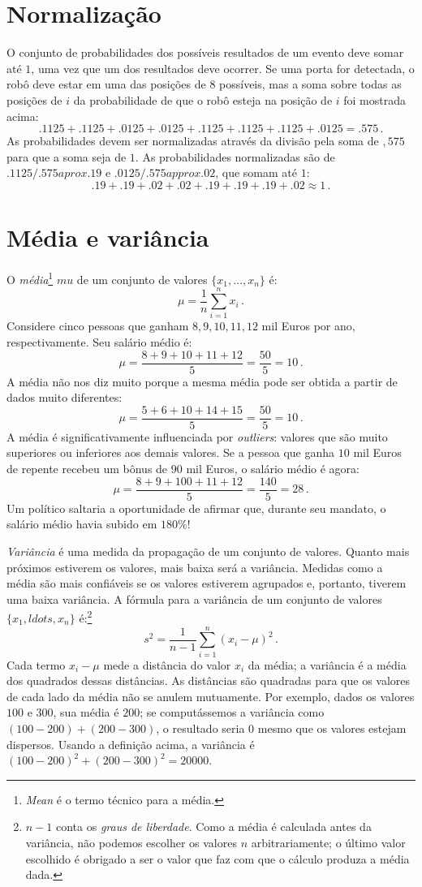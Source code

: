 \section{Normalização}\label{a.normalize}

O conjunto de probabilidades dos possíveis resultados de um evento deve somar até $1$, uma vez que um dos resultados deve ocorrer. Se uma porta for detectada, o robô deve estar em uma das posições de $8$ possíveis, mas a soma sobre todas as posições de $i$ da probabilidade de que o robô esteja na posição de $i$ foi mostrada acima:
\[
.1125 + .1125 + .0125 + .0125 + .1125 + .1125 + .1125 + .0125 = .575\,.
\]
As probabilidades devem ser {normalizadas} através da divisão pela soma de $,575$ para que a soma seja de $1$. As probabilidades normalizadas são de $.1125/.575 aprox .19$ e $.0125/.575 approx .02$, que somam até $1$:
\[.19 + .19 + .02 + .02 + .19 + .19 + .19 + .02 \approx 1\,.\]

\section{Média e variância}\label{a.mean}

O \emph{média}\footnote{\textit{Mean} é o termo técnico para a média.} $mu$ de um conjunto de valores $\{x_1,\ldots,x_n\}$ é:
\[
\mu = \frac{1}{n}\sum^n_{i=1} x_i\,.
\]
Considere cinco pessoas que ganham $8,9,10,11,12$ mil Euros por ano, respectivamente. Seu salário médio é:
\[
\mu = \frac{8+9+10+11+12}{5} = \frac{50}{5} = 10\,.
\]
A média não nos diz muito porque a mesma média pode ser obtida a partir de dados muito diferentes:
\[
\mu = \frac{5+6+10+14+15}{5} = \frac{50}{5} = 10\,.
\]
A média é significativamente influenciada por \emph{outliers}: valores que são muito superiores ou inferiores aos demais valores. Se a pessoa que ganha $10$ mil Euros de repente recebeu um bônus de $90$ mil Euros, o salário médio é agora:
\[
\mu = \frac{8+9+100+11+12}{5} = \frac{140}{5} = 28\,.
\]
Um político saltaria a oportunidade de afirmar que, durante seu mandato, o salário médio havia subido em $180\%$!

\emph{Variância} é uma medida da propagação de um conjunto de valores. Quanto mais próximos estiverem os valores, mais baixa será a variância. Medidas como a média são mais confiáveis se os valores estiverem agrupados e, portanto, tiverem uma baixa variância. A fórmula para a variância de um conjunto de valores $\{x_1,ldots,x_n\}$ é:\footnote{$n-1$ conta os \emph{graus de liberdade}. Como a média é calculada antes da variância, não podemos escolher os valores $n$ arbitrariamente; o último valor escolhido é obrigado a ser o valor que faz com que o cálculo produza a média dada.}
\[
s^2 = \frac{1}{n-1}\sum^n_{i=1} (x_i-\mu)^2\,.
\]
Cada termo $x_i-\mu$ mede a distância do valor $x_i$ da média; a variância é a média dos quadrados dessas distâncias. As distâncias são quadradas para que os valores de cada lado da média não se anulem mutuamente. Por exemplo, dados os valores $100$ e $300$, sua média é $200$; se computássemos a variância como $(100-200)+(200-300)$, o resultado seria $0$ mesmo que os valores estejam dispersos. Usando a definição acima, a variância é $(100-200)^2+(200-300)^2=20000$.

